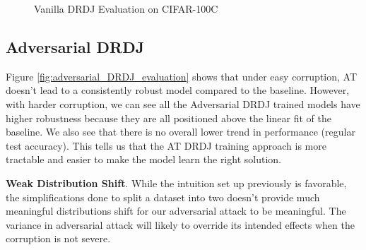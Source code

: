 \documentclass{article}
\begin{document}
\begin{figure}
  \centering
    \qquad
    \caption{Vanilla DRDJ Evaluation on CIFAR-100C}%
    \label{fig:vanilla_DRDJ_evaluation}%
\end{figure}

\subsection{Adversarial DRDJ}
Figure \ref{fig:adversarial_DRDJ_evaluation} shows that under easy corruption, AT doesn't lead 
to a consistently robust model compared to the baseline. However, with harder corruption, 
we can see all the Adversarial DRDJ trained models have higher robustness because they 
are all positioned above the linear fit of the baseline. We also see that there is no 
overall lower trend in performance (regular test accuracy). This tells us that the AT 
DRDJ training approach is more tractable and easier to make the model learn the right 
solution.

\textbf{Weak Distribution Shift}. While the intuition set up previously 
is favorable, the simplifications done to split a dataset into two doesn't provide 
much meaningful distributions shift for our adversarial attack to be meaningful. 
The variance in adversarial attack will likely to override its intended effects 
when the corruption is not severe. 
\end{document}
